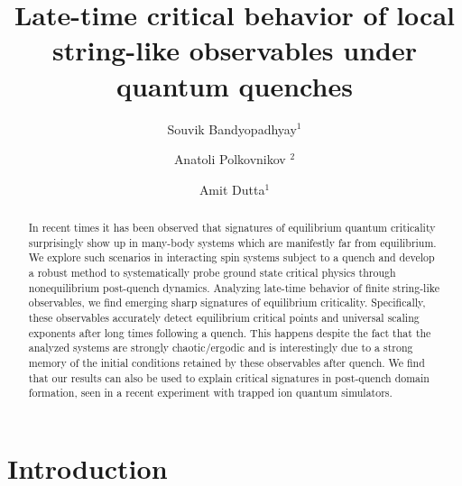 \documentclass[aps,prx,twocolumn]{revtex4-2}
\begin{document}
\title{Late-time critical behavior of local  string-like observables under quantum quenches}
\author{Souvik Bandyopadhyay$^1$} 
\author{Anatoli Polkovnikov $^2$}
\author{Amit Dutta$^1$}

\begin{abstract}
	In recent times it has been observed that signatures of equilibrium quantum criticality surprisingly show up in many-body systems which are manifestly far from equilibrium.  We explore such scenarios in interacting spin systems subject to a quench and develop a robust method to systematically probe ground state critical physics through nonequilibrium post-quench dynamics. Analyzing late-time behavior of finite string-like observables, we find emerging sharp signatures of equilibrium criticality.  Specifically, these observables accurately detect equilibrium critical points and universal scaling exponents after long times following a quench. This happens despite the fact that the analyzed systems are strongly chaotic/ergodic and is interestingly due to a strong memory of the initial conditions retained by these observables after quench. We find that our results can also be used to explain critical signatures in post-quench domain formation, seen in a recent experiment with trapped ion quantum simulators. 
\end{abstract}


\maketitle


\section{Introduction}
\label{sec:intro}
\end{document}
